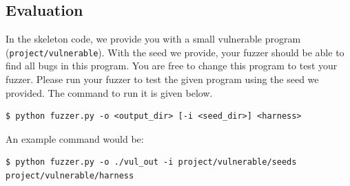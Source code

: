 \documentclass[letterpaper,11pt]{article}
\begin{document}





\subsection{Evaluation}

In the skeleton code, we provide you with a small vulnerable program (\texttt{project/vulnerable}).
With the seed we provide, your fuzzer should be able to find all bugs in this program.
You are free to change this program to test your fuzzer.
Please run your fuzzer to test the given program using the seed we provided. The command to run it is given below.
\begin{verbatim}
$ python fuzzer.py -o <output_dir> [-i <seed_dir>] <harness>
\end{verbatim}

An example command would be:

\begin{verbatim}
$ python fuzzer.py -o ./vul_out -i project/vulnerable/seeds
project/vulnerable/harness
\end{verbatim}
\end{document}
